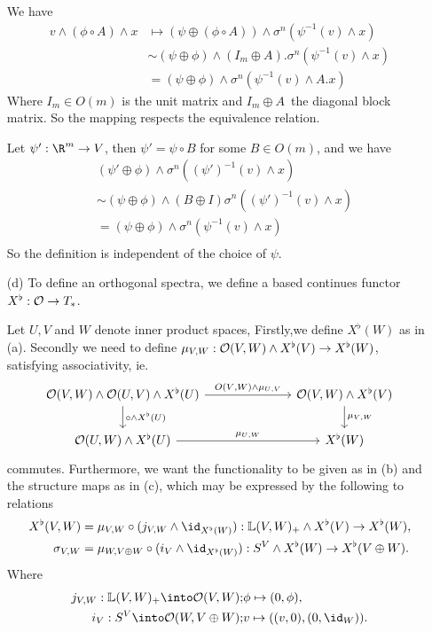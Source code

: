 \begin{exercise}[2]
\begin{enumerate}
We have 
\begin{align*}
v \wedge (\phi \circ A) \wedge x 
&\mapsto (\psi \oplus (\phi \circ A)) \wedge \sigma^n(\psi^{-1}(v) \wedge x) \\
&\sim (\psi \oplus \phi) \wedge (I_m\oplus A) . \sigma^n (\psi^{-1}(v) \wedge x)
\\
&= (\psi \oplus \phi) \wedge \sigma^n (\psi^{-1}(v) \wedge A.x)
\end{align*}
Where $I_m \in O(m)$ is the unit matrix and $I_m\oplus A$ the diagonal block
matrix. So the mapping respects the equivalence relation. 

Let $\psi' : \R^m \to V$, then $\psi' = \psi \circ B$ for some $B \in O(m)$, and
we have
\begin{align*}
&(\psi' \oplus \phi) \wedge \sigma^n ((\psi')^{-1}(v) \wedge x) \\
&\sim (\psi \oplus \phi) \wedge (B \oplus I)\sigma^n ((\psi')^{-1}(v) \wedge x) \\
&= (\psi \oplus \phi) \wedge \sigma^n (\psi^{-1}(v) \wedge x) \\
\end{align*}
So the definition is independent of the choice of $\psi$.

\item[(d)]
To define an orthogonal spectra, we define a based continues functor $X^\flat :
\mathcal{O} \to T_*$. 


Let $U, V$ and $W$ denote inner product spaces, 
Firstly,we define $X^\flat (W)$ as in (a). Secondly we need to define 
$\mu_{V,W}: \mathcal{O}(V, W) \wedge X^\flat(V) \to X^\flat(W)$, satisfying
associativity, ie. 
\[ \begin{tikzcd}[column sep = 7em]
\O(V, W) \wedge \O(U,V) \wedge X^\flat(U) 
\arrow[r, "O(V{,}W) \wedge \mu_{U{,}V}"] 
\arrow[d, "\circ \wedge X^\flat(U)"] 
& \O(V, W) \wedge X^\flat(V) 
\arrow[d, "\mu_{V{,}W}"] \\ 
\O(U,W) \wedge X^\flat(U) 
\arrow[r, "\mu_{U{,}W}"] 
& X^\flat(W)
\end{tikzcd} \]
commutes. Furthermore, we want the functionality to be given as in (b) and the
structure maps as in (c), which may be expressed by the following to relations
\begin{equation}
\begin{split}
X^\flat(V,W) &= \mu_{V, W} \circ (j_{V,W} \wedge \id_{X^\flat(W)}) : 
\L(V, W)_+ \wedge X^\flat (V) \to X^\flat(W),
\\
\sigma_{V,W} &= \mu_{W,V\oplus W} \circ (i_V \wedge \id_{X^\flat(W)}) :
S^V \wedge X^\flat (W) \to X^\flat(V \oplus W).
\end{split}
\end{equation}
Where 
\begin{align*}
j_{V,W} : \L(V,W)_+ \into \O(V,W); & \phi \mapsto (0,\phi), \\
i_V : S^V \into \O(W, V\oplus W); & v \mapsto ((v,0), (0,\id_W)).
\end{align*}



\end{enumerate}
\end{exercise}
